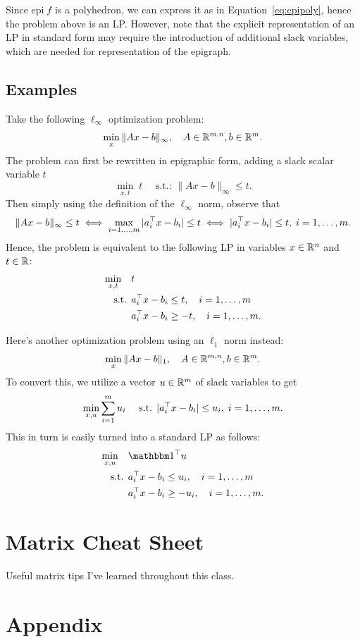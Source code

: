 \documentclass[11 pt]{scrartcl}
\newcommand{\epi}{\text{epi}\;}
\begin{document}
Since $\epi f$ is a polyhedron, we can express it as in Equation~\ref{eq:epipoly}, hence the problem above is an LP. 
However, note that the explicit representation of an LP in standard form may require the introduction of additional slack variables, which are needed for representation of the epigraph.

\subsection{Examples}
\begin{example}
    Take the following $\ell_\infty$ optimization problem: 
    \[ \min_x \|Ax - b\|_\infty, \quad A\in \mathbb R^{m,n}, b\in \mathbb R^{m}.\]
    The problem can first be rewritten in epigraphic form, adding a slack scalar variable $t$ 
    \[ \min_{x,t}\; t\quad \text{ s.t.: } \|Ax-b\|_\infty \leq t.\] 
    Then simply using the definition of the $\ell_\infty$ norm, observe that 
    \[ \|Ax-b\|_\infty \leq t \iff \max_{i=1,\dots,m} |a_i^\top x - b_i| \leq t \iff |a_i^\top x - b_i| \leq t, \; i = 1,\dots, m.\] 
    Hence, the problem is equivalent to the following LP in variables $x\in \mathbb R^n$ and $t\in \mathbb R$: 
    \begin{align*}
        \min_{x,t}\quad &t \\ 
        \text{ s.t. } &a_i^\top x - b_i \leq t, \quad i = 1,\dots, m \\ 
                                           &a_i^\top x - b_i \geq -t, \quad i = 1,\dots, m.
    \end{align*}
\end{example}

\begin{example}
    Here's another optimization problem using an $\ell_1$ norm instead:
    \[ \min_x \|Ax - b\|_1, \quad A\in \mathbb R^{m,n}, b\in \mathbb R^{m}.\]
    To convert this, we utilize a vector $u\in \mathbb R^m$ of slack variables to get 
    \[ \min_{x,u} \sum_{i=1}^m u_i \quad \text{ s.t. } |a_i^\top x - b_i|\leq u_i,\; i=1,\dots, m.\] 
    This in turn is easily turned into a standard LP as follows:
    \begin{align*}
        \min_{x,u}\quad &\one^\T u \\
        \text{ s.t. } &a_i^\T x - b_i \leq u_i, \quad i = 1,\dots, m \\ 
                      &a_i^\T x - b_i \geq -u_i, \quad i = 1,\dots, m.
    \end{align*}
\end{example}

\newpage
\section{Matrix Cheat Sheet}
Useful matrix tips I've learned throughout this class. 


\section{Appendix}
\renewcommand{\listtheoremname}{List of Definitions and Theorems}
\listoftheorems[ignoreall,show={theorem,definition}]
\end{document}
